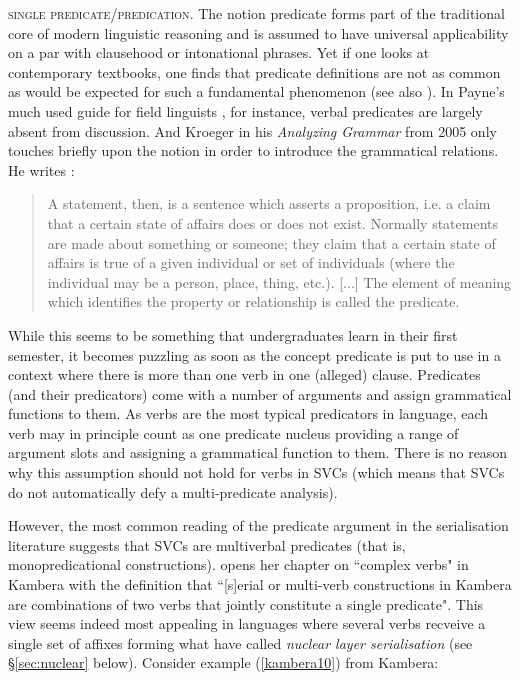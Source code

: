 \textsc{single predicate/predication}. The notion predicate forms part of the traditional core of modern linguistic reasoning and is assumed to have universal applicability on a par with clausehood or intonational phrases. Yet if one looks at contemporary textbooks, one finds that predicate definitions are not as common as would be expected for such a fundamental phenomenon (see also \citealt{baker2010complex}). In Payne's much used guide for field linguists \parencite{payne1997describing}, for instance, verbal predicates are largely absent from discussion. And Kroeger in his \textit{Analyzing Grammar} from 2005 only touches briefly upon the notion in order to introduce the grammatical relations. He writes \citep[53]{kroeger2005analyzing}:
\begin{quote}A statement, then, is a sentence which asserts a proposition, i.e. a claim that a certain state of affairs does or does not exist. Normally statements are made about something or someone; they claim that a certain state of affairs is true of a given individual or set of individuals (where the individual may
be a person, place, thing, etc.). [...] The element of meaning which identifies the property or relationship is called the predicate.\end{quote}
While this seems to be something that undergraduates learn in their first semester, it becomes puzzling as soon as the concept predicate is put to use in a context where there is more than one verb in one (alleged) clause. Predicates (and their predicators) come with a number of arguments and assign grammatical functions to them. As verbs are the most typical predicators in language, each verb may in principle count as one predicate nucleus providing a range of argument slots and assigning a grammatical function to them. There is no reason why this assumption should not hold for verbs in SVCs (which means that SVCs do not automatically defy a multi-predicate analysis).

However, the most common reading of the predicate argument in the serialisation literature suggests that SVCs are multiverbal predicates (that is, monopredicational constructions). \citet{klamer1998grammar} opens her chapter on ``complex verbs" in Kambera with the definition that ``[s]erial or multi-verb constructions in Kambera are combinations of two verbs that jointly constitute a single predicate". This view seems indeed most appealing in languages where several verbs recveive a single set of affixes forming what \citet{foley1984functional} have called \textit{nuclear layer serialisation} (see §\ref{sec:nuclear} below). Consider example (\ref{kambera10}) from Kambera:

